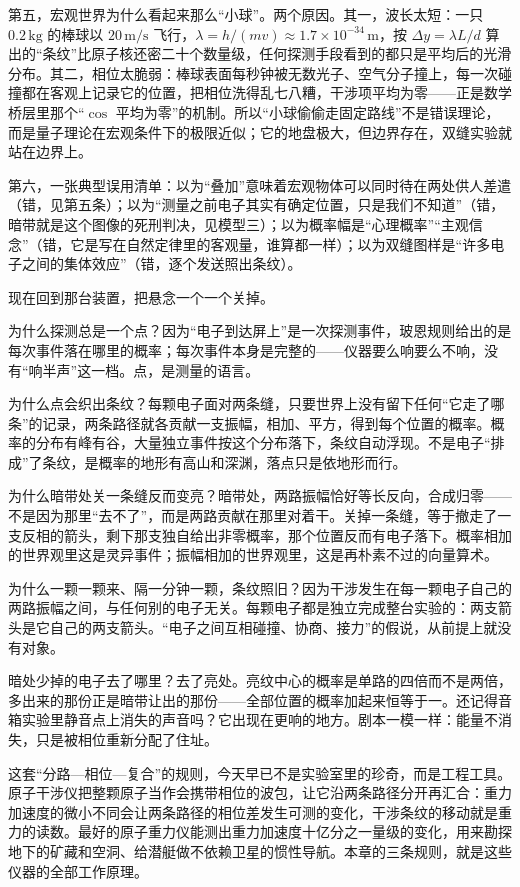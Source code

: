 第五，宏观世界为什么看起来那么“小球”。两个原因。其一，波长太短：一只 \(0.2\,\mathrm{kg}\) 的棒球以 \(20\,\mathrm{m/s}\) 飞行，\(\lambda = h/(mv) \approx 1.7\times10^{-34}\,\mathrm{m}\)，按 \(\Delta y = \lambda L/d\) 算出的“条纹”比原子核还密二十个数量级，任何探测手段看到的都只是平均后的光滑分布。其二，相位太脆弱：棒球表面每秒钟被无数光子、空气分子撞上，每一次碰撞都在客观上记录它的位置，把相位洗得乱七八糟，干涉项平均为零——正是数学桥层里那个“\(\cos\) 平均为零”的机制。所以“小球偷偷走固定路线”不是错误理论，而是量子理论在宏观条件下的极限近似；它的地盘极大，但边界存在，双缝实验就站在边界上。

第六，一张典型误用清单：以为“叠加”意味着宏观物体可以同时待在两处供人差遣（错，见第五条）；以为“测量之前电子其实有确定位置，只是我们不知道”（错，暗带就是这个图像的死刑判决，见模型三）；以为概率幅是“心理概率”“主观信念”（错，它是写在自然定律里的客观量，谁算都一样）；以为双缝图样是“许多电子之间的集体效应”（错，逐个发送照出条纹）。


现在回到那台装置，把悬念一个一个关掉。

为什么探测总是一个点？因为“电子到达屏上”是一次探测事件，玻恩规则给出的是每次事件落在哪里的概率；每次事件本身是完整的——仪器要么响要么不响，没有“响半声”这一档。点，是测量的语言。

为什么点会织出条纹？每颗电子面对两条缝，只要世界上没有留下任何“它走了哪条”的记录，两条路径就各贡献一支振幅，相加、平方，得到每个位置的概率。概率的分布有峰有谷，大量独立事件按这个分布落下，条纹自动浮现。不是电子“排成”了条纹，是概率的地形有高山和深渊，落点只是依地形而行。

为什么暗带处关一条缝反而变亮？暗带处，两路振幅恰好等长反向，合成归零——不是因为那里“去不了”，而是两路贡献在那里对着干。关掉一条缝，等于撤走了一支反相的箭头，剩下那支独自给出非零概率，那个位置反而有电子落下。概率相加的世界观里这是灵异事件；振幅相加的世界观里，这是再朴素不过的向量算术。

为什么一颗一颗来、隔一分钟一颗，条纹照旧？因为干涉发生在每一颗电子自己的两路振幅之间，与任何别的电子无关。每颗电子都是独立完成整台实验的：两支箭头是它自己的两支箭头。“电子之间互相碰撞、协商、接力”的假说，从前提上就没有对象。

暗处少掉的电子去了哪里？去了亮处。亮纹中心的概率是单路的四倍而不是两倍，多出来的那份正是暗带让出的那份——全部位置的概率加起来恒等于一。还记得音箱实验里静音点上消失的声音吗？它出现在更响的地方。剧本一模一样：能量不消失，只是被相位重新分配了住址。

这套“分路—相位—复合”的规则，今天早已不是实验室里的珍奇，而是工程工具。原子干涉仪把整颗原子当作会携带相位的波包，让它沿两条路径分开再汇合：重力加速度的微小不同会让两条路径的相位差发生可测的变化，干涉条纹的移动就是重力的读数。最好的原子重力仪能测出重力加速度十亿分之一量级的变化，用来勘探地下的矿藏和空洞、给潜艇做不依赖卫星的惯性导航。本章的三条规则，就是这些仪器的全部工作原理。

